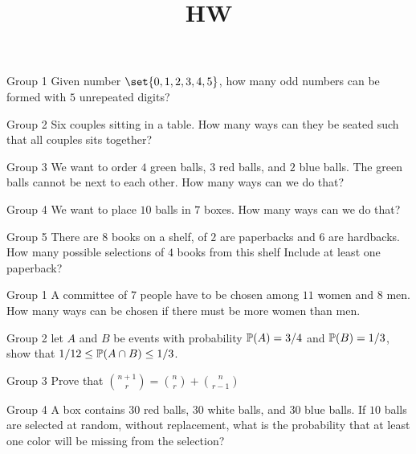 \documentclass{article}
\title{HW}
\author{}
\date{}
\begin{document}
\maketitle

\begin{problem}
    {Group 1}
    Given number $\set{0,1,2,3,4,5}$, how many odd numbers can be formed with $5$ unrepeated digits?
\end{problem}

\begin{problem}
    {Group 2}
    Six couples sitting in a table. How many ways can they be seated such that all couples sits together?
\end{problem}

\begin{problem}
    {Group 3}
    We want to order $4$ green balls, $3$ red balls, and $2$ blue balls. The green balls cannot be next to each other. How many ways can we do that?
\end{problem}

\begin{problem}
    {Group 4}
    We want to place $10$ balls in $7$ boxes. How many ways can we do that?
\end{problem}

\begin{problem}
    {Group 5}
    There are $8$ books on a shelf, of $2$ are paperbacks and $6$ are hardbacks. How many possible selections of $4$ books from this shelf Include at least one paperback?
\end{problem}
\begin{problem}
    {Group 1}
    A committee of $7$ people have to be chosen among $11$ women and $8$ men. How many ways can be chosen if there must be more women than men.
\end{problem}

\begin{problem}
    {Group 2}
    let $A$ and $B$ be events with probability $\P{A}=3/4$ and $\P{B}=1/3$, show that $1/12\leq \P{A\cap B}\leq 1/3$.
\end{problem}

\begin{problem}
    {Group 3}
    Prove that $\binom{n+1}{r}=\binom{n}{r}+\binom{n}{r-1}$
\end{problem}

\begin{problem}
    {Group 4}
    A box contains $30$ red balls, $30$ white balls, and $30$ blue balls. If $10$ balls are selected at random, without replacement, what is the probability that at least one color will be missing from the selection?
\end{problem}
\end{document}
